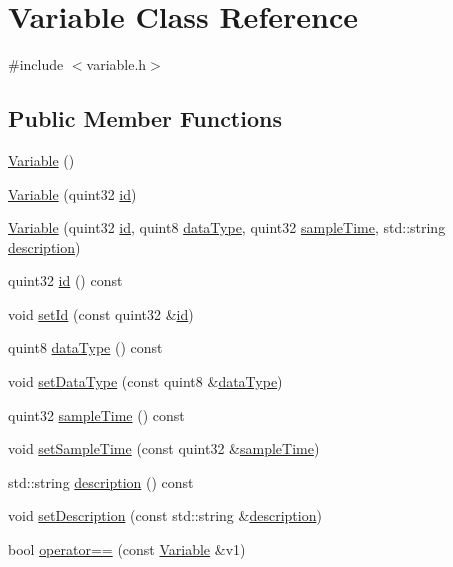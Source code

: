 \hypertarget{class_variable}{}\section{Variable Class Reference}
\label{class_variable}


{\ttfamily \#include $<$variable.\+h$>$}

\subsection*{Public Member Functions}
\begin{DoxyCompactItemize}
\item 
\hyperlink{class_variable_a5716c9dcafcc8cf59a6f6b5dac3ec7a2}{Variable} ()
\item 
\hyperlink{class_variable_a9b343428855b74ef2dede9f86ef02899}{Variable} (quint32 \hyperlink{class_variable_ae8a3f787087e8b8efff4ff39a72d35c0}{id})
\item 
\hyperlink{class_variable_af5d6b6bcaff2a5083cf6bc9e4e9c6381}{Variable} (quint32 \hyperlink{class_variable_ae8a3f787087e8b8efff4ff39a72d35c0}{id}, quint8 \hyperlink{class_variable_a980eea29f5d94e35b7070cde3c15ddf5}{data\+Type}, quint32 \hyperlink{class_variable_a904efd991952e545e8a038491b9da56d}{sample\+Time}, std\+::string \hyperlink{class_variable_a52bac3d1ddb969e09249a7bb4b0dd062}{description})
\item 
quint32 \hyperlink{class_variable_ae8a3f787087e8b8efff4ff39a72d35c0}{id} () const 
\item 
void \hyperlink{class_variable_af1a81b07cee74cc6dbf42209dca69f62}{set\+Id} (const quint32 \&\hyperlink{class_variable_ae8a3f787087e8b8efff4ff39a72d35c0}{id})
\item 
quint8 \hyperlink{class_variable_a980eea29f5d94e35b7070cde3c15ddf5}{data\+Type} () const 
\item 
void \hyperlink{class_variable_aaefbd42cd263211594bb2c782ac5665f}{set\+Data\+Type} (const quint8 \&\hyperlink{class_variable_a980eea29f5d94e35b7070cde3c15ddf5}{data\+Type})
\item 
quint32 \hyperlink{class_variable_a904efd991952e545e8a038491b9da56d}{sample\+Time} () const 
\item 
void \hyperlink{class_variable_a8638d38ebcb514b36d859a57d2fba3b8}{set\+Sample\+Time} (const quint32 \&\hyperlink{class_variable_a904efd991952e545e8a038491b9da56d}{sample\+Time})
\item 
std\+::string \hyperlink{class_variable_a52bac3d1ddb969e09249a7bb4b0dd062}{description} () const 
\item 
void \hyperlink{class_variable_a70f1fc39c26c7826620ebcfaffb1c0b6}{set\+Description} (const std\+::string \&\hyperlink{class_variable_a52bac3d1ddb969e09249a7bb4b0dd062}{description})
\item 
bool \hyperlink{class_variable_ad715c970a09341097eb8fd1f846385ec}{operator==} (const \hyperlink{class_variable}{Variable} \&v1)
\end{DoxyCompactItemize}


